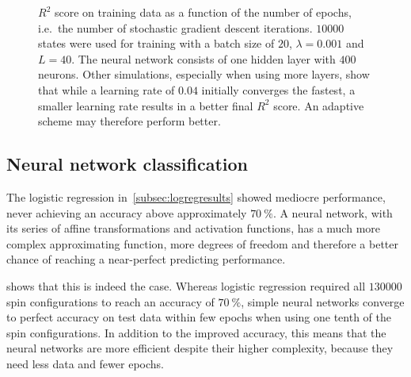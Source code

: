 \documentclass[11pt,british,a4paper]{article}
\numberwithin{equation}{section}
\begin{document}
\begin{figure}[H]
    \centering
    \caption{\(R^2\) score on training data as a function of the number of epochs, i.e.\ the number of stochastic gradient descent iterations. \(\num{10000}\) states were used for training with a batch size of \(20\), \(\lambda=\num{0.001}\) and \(L=40\). The neural network consists of one hidden layer with \(400\) neurons. Other simulations, especially when using more layers, show that while a learning rate of \(\num{0.04}\) initially converges the fastest, a smaller learning rate results in a better final \(R^2\) score. An adaptive scheme may therefore perform better.}\label{fig:r2nnspin}
\end{figure}

\subsection{Neural network classification}
The logistic regression in~\vref{subsec:logregresults} showed mediocre performance, never achieving an accuracy above approximately \(\SI{70}{\percent}\). A neural network, with its series of affine transformations and activation functions, has a much more complex approximating function, more degrees of freedom and therefore a better chance of reaching a near-perfect predicting performance.

 shows that this is indeed the case. Whereas logistic regression required all \(\num{130000}\) spin configurations to reach an accuracy of \(\SI{70}{\percent}\), simple neural networks converge to perfect accuracy on test data within few epochs when using one tenth of the spin configurations. In addition to the improved accuracy, this means that the neural networks are more efficient despite their higher complexity, because they need less data and fewer epochs.
\end{document}
